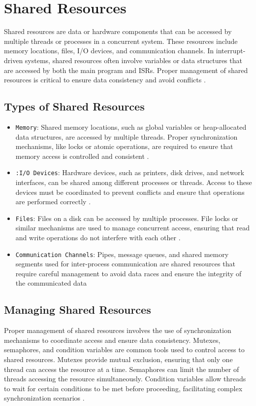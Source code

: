 \documentclass[
fancyheadings, %
%
%
]{stsreprt}
\begin{document}
{\section{Shared Resources}
Shared resources are data or hardware components that can be accessed by multiple threads or processes in a concurrent system. These resources include memory locations, files, I/O devices, and communication channels. In interrupt-driven systems, shared resources often involve variables or data structures that are accessed by both the main program and ISRs. Proper management of shared resources is critical to ensure data consistency and avoid conflicts \cite{herlihy2008}.
\subsection{Types of Shared Resources}
\begin{itemize}
	\item \texttt{Memory}: Shared memory locations, such as global variables or heap-allocated data structures, are accessed by multiple threads. Proper synchronization mechanisms, like locks or atomic operations, are required to ensure that memory access is controlled and consistent \cite{herlihy2008}.

	\item \texttt{:I/O Devices}: Hardware devices, such as printers, disk drives, and network interfaces, can be shared among different processes or threads. Access to these devices must be coordinated to prevent conflicts and ensure that operations are performed correctly \cite{burns2009}.

	\item \texttt{Files}: Files on a disk can be accessed by multiple processes. File locks or similar mechanisms are used to manage concurrent access, ensuring that read and write operations do not interfere with each other \cite{labrosse2002}.

	\item \texttt{Communication Channels}: Pipes, message queues, and shared memory segments used for inter-process communication are shared resources that require careful management to avoid data races and ensure the integrity of the communicated data \cite{herlihy2008}
\end{itemize}
\subsection{Managing Shared Resources}
Proper management of shared resources involves the use of synchronization mechanisms to coordinate access and ensure data consistency. Mutexes, semaphores, and condition variables are common tools used to control access to shared resources. Mutexes provide mutual exclusion, ensuring that only one thread can access the resource at a time. Semaphores can limit the number of threads accessing the resource simultaneously. Condition variables allow threads to wait for certain conditions to be met before proceeding, facilitating complex synchronization scenarios \cite{herlihy2008}.
}
\end{document}
